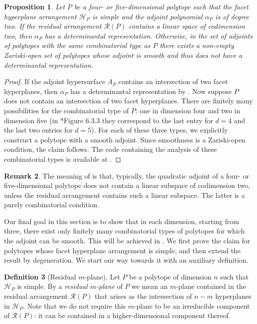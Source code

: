 \documentclass[a4paper,10pt]{amsart}
\theoremstyle{definition}
\newtheorem{Def}{Definition}[section]
\newtheorem{rem}[Def]{Remark}
\theoremstyle{plain}
\newtheorem{prop}[Def]{Proposition}
\newcommand{\cR}{{\mathcal R}}
\begin{document}
\begin{prop}\label{prop:45quadrics}
Let $P$ be a four- or five-dimensional polytope such that the facet hyperplane arrangement $\mathcal{H}_P$ is simple and the adjoint polynomial $\alpha_P$ is of degree two. If the residual arrangement $\cR(P)$ contains a linear space of codimension two, then $\alpha_P$ has a determinantal representation. Otherwise, in the set of  adjoints of polytopes with the same combinatorial type as $P$ there exists a non-empty Zariski-open set of polytopes whose adjoint is smooth and thus does not have a determinantal representation. 
\end{prop}

\begin{proof}
    If the adjoint hypersurface $A_P$ contains an intersection of two facet hyperplanes, then $\alpha_P$ has a determinantal representation by . Now suppose $P$ does not contain an intersection of two facet hyperplanes. There are finitely many possibilities for the combinatorial type of $P$: one in dimension four and two in dimension five (in \cite{grunbaum1967convex}*{Figure 6.3.3} they correspond to the last entry for $d=4$ and the last two entries for $d=5$). For each of these three types, we explicitly construct a polytope with a smooth adjoint. Since smoothness is a Zariski-open condition, the claim follows. The code containing the analysis of these combinatorial types is available at \cite{detrepscode}.
\end{proof}

\begin{rem}
    The meaning of  is that, typically, the quadratic adjoint of a four- or five-dimensional polytope does not contain a linear subspace of codimension two, unless the residual arrangement contains such a linear subspace. The latter is a purely combinatorial condition.    
\end{rem}

Our final goal in this section is to show that in each dimension, starting from three, there exist only finitely many combinatorial types of polytopes for which the adjoint can be smooth. This will be achieved in . We first prove the claim for polytopes whose facet hyperplane arrangement is simple, and then extend the result by degeneration. We start our way towards it with an auxiliary definition. 

\begin{Def}[Residual $m$-plane]
    Let $P$ be a polytope of dimension $n$ such that $\mathcal{H}_P$ is simple. By a \emph{residual $m$-plane} of $P$ we mean an $m$-plane contained in the residual arrangement $\mathcal{R}(P)$ that arises as the intersection of $n-m$ hyperplanes in $\mathcal{H}_P$. Note that we do not require this $m$-plane to be an irreducible component of $\mathcal{R}(P)$: it can be contained in a higher-dimensional component thereof.
\end{Def}
\end{document}
